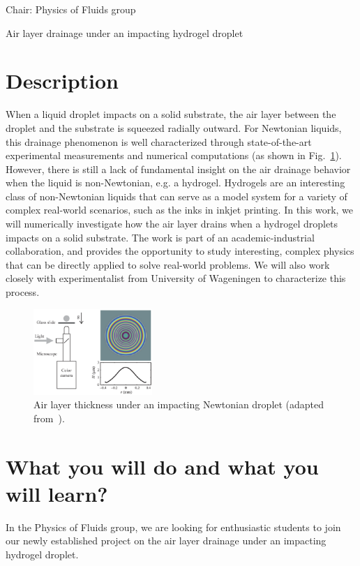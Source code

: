 \documentclass[a4paper,10pt]{article}
\begin{document}
 

\noindent Chair: Physics of Fluids group
\begin{center}
 \begin{LARGE}
Air layer drainage under an impacting hydrogel droplet
 \end{LARGE}
\end{center}

\section*{Description}
When a liquid droplet impacts on a solid substrate, the air layer between the droplet and the substrate is squeezed radially outward. For Newtonian liquids, this drainage phenomenon is well characterized through state-of-the-art experimental measurements and numerical computations (as shown in Fig.~\ref{figure}). However, there is still a lack of fundamental insight on the air drainage behavior when the liquid is non-Newtonian, e.g. a hydrogel. Hydrogels are an interesting class of non-Newtonian liquids that can serve as a model system for a variety of complex real-world scenarios, such as the inks in inkjet printing. In this work, we will numerically investigate how the air layer drains when a hydrogel droplets impacts on a solid substrate. The work is part of an academic-industrial collaboration, and provides the opportunity to study interesting, complex physics that can be directly applied to solve real-world problems. We will also work closely with experimentalist from University of Wageningen to characterize this process. 

\begin{figure}[h]
\centering
\includegraphics[width=0.4\textwidth]{air_layer.eps}
\caption{Air layer thickness under an impacting Newtonian droplet (adapted from~\cite{bouwhuis-2012-prl}).}
\label{figure}
\end{figure}

\section*{What you will do and what you will learn?}
In the Physics of Fluids group, we are looking for enthusiastic students to join our newly established project on the air layer drainage under an impacting hydrogel droplet.
\end{document}
